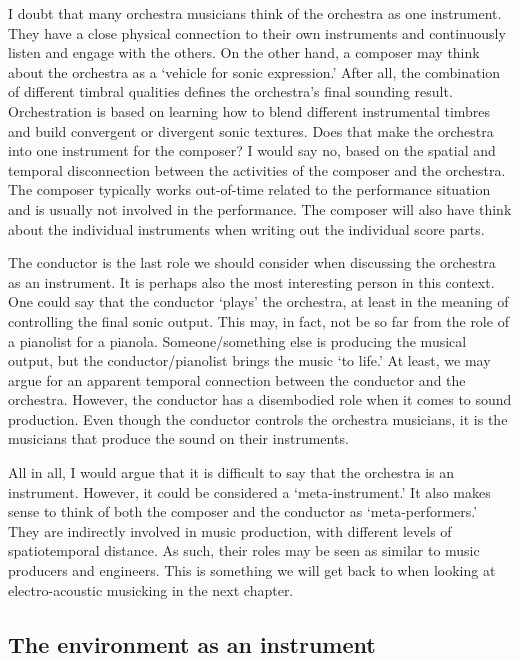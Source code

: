 I doubt that many orchestra musicians think of the orchestra as one instrument. They have a close physical connection to their own instruments and continuously listen and engage with the others. On the other hand, a composer may think about the orchestra as a `vehicle for sonic expression.' After all, the combination of different timbral qualities defines the orchestra's final sounding result. Orchestration is based on learning how to blend different instrumental timbres and build convergent or divergent sonic textures. Does that make the orchestra into one instrument for the composer? I would say no, based on the spatial and temporal disconnection between the activities of the composer and the orchestra. The composer typically works out-of-time related to the performance situation and is usually not involved in the performance. The composer will also have think about the individual instruments when writing out the individual score parts.

The conductor is the last role we should consider when discussing the orchestra as an instrument. It is perhaps also the most interesting person in this context. One could say that the conductor `plays' the orchestra, at least in the meaning of controlling the final sonic output. This may, in fact, not be so far from the role of a pianolist for a pianola. Someone/something else is producing the musical output, but the conductor/pianolist brings the music `to life.' At least, we may argue for an apparent temporal connection between the conductor and the orchestra. However, the conductor has a disembodied role when it comes to sound production. Even though the conductor controls the orchestra musicians, it is the musicians that produce the sound on their instruments.

All in all, I would argue that it is difficult to say that the orchestra is an instrument. However, it could be considered a `meta-instrument.' It also makes sense to think of both the composer and the conductor as `meta-performers.' They are indirectly involved in music production, with different levels of spatiotemporal distance. As such, their roles may be seen as similar to music producers and engineers. This is something we will get back to when looking at electro-acoustic musicking in the next chapter.


\subsection{The environment as an instrument}\label{sec:space}

